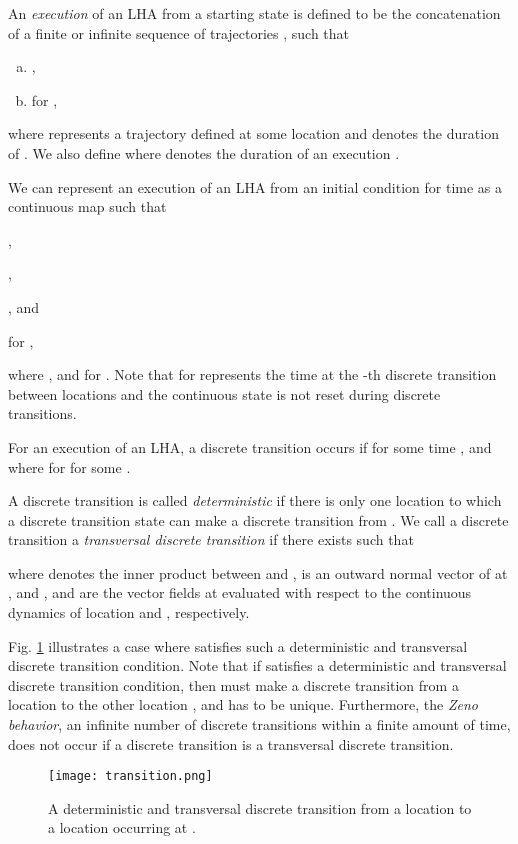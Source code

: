 \begin{defn} \label{def:exec}An \emph{execution}  of an LHA  from a starting state  is defined to be the concatenation of a finite or infinite sequence of trajectories , such that
\begin{enumerate}[(a)]
    \item ,
    \item  for , 
\end{enumerate}
where  represents a trajectory defined at some location  and  denotes the duration of  .
We also define  where  denotes the duration of an execution .
\end{defn}


We can represent an execution  of an LHA  from an initial condition  for time  as a continuous map  such that
\begin{inparaenum}[(a)]
    \item ,
    \item ,
    \item , and
    \item  for ,
\end{inparaenum}
where , and  for .
Note that  for  represents the time at the -th discrete transition between locations and the continuous state is not reset during discrete transitions.

\begin{defn} \label{def:trans} For an execution  of an LHA, a discrete transition  occurs if  for some time , 
 and  where  for  for some .

\end{defn}
\begin{defn} \label{def:transversal}  A discrete transition is called \emph{deterministic} if there is only one location  to which a discrete transition state  can make a discrete transition from . 
We call a discrete transition a \emph{transversal discrete transition} if there exists  such that

where  denotes the inner product between  and ,  is an outward normal vector of  at , and , and  are the vector fields at  evaluated with respect to the continuous dynamics of location  and , respectively. 
\end{defn}
Fig. \ref{fig:transition} illustrates a case where  satisfies such a deterministic and transversal discrete transition condition.
Note that if  satisfies a deterministic and transversal discrete transition condition, then  must make a discrete transition from a location  to the other location , and  has to be unique. 
Furthermore, the \emph{Zeno behavior}, an infinite number of discrete transitions within a finite amount of time, does not occur if a discrete transition is a transversal discrete transition.
\begin{figure}
\begin{center}
  \texttt{[image: transition.png]} \caption{A deterministic and transversal discrete transition from a location  to a location  occurring at .}
\label{fig:transition}
\end{center}
\end{figure}



